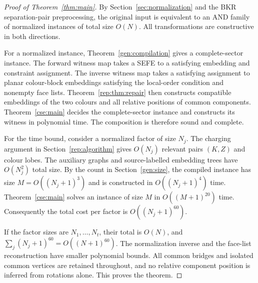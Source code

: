 \begin{proof}[Proof of Theorem~\ref{thm:main}]
By Section~\ref{sec:normalization} and the BKR separation-pair
preprocessing, the original input is equivalent to an AND family of
normalized instances of total size $O(N)$.  All transformations are
constructive in both directions.

For a normalized instance, Theorem~\ref{gen:compilation} gives a
complete-sector instance.  The forward witness map takes a SEFE to a
satisfying embedding and constraint assignment.  The inverse witness map
takes a satisfying assignment to planar colour-block embeddings satisfying
the local-order condition and nonempty face lists.  Theorem~\ref{rep:thm:repair}
then constructs compatible embeddings of the two colours and all relative
positions of common components.  Theorem~\ref{cse:main} decides the
complete-sector instance and constructs its witness in polynomial time.
The composition is therefore sound and complete.

For the time bound, consider a normalized factor of size $N_j$.  The
charging argument in Section~\ref{rep:algorithm} gives $O(N_j)$ relevant
pairs $(K,Z)$ and colour lobes.  The auxiliary graphs and source-labelled
embedding trees have $O(N_j^2)$ total size.  By the count in
Section~\ref{gen:size}, the compiled instance has size
$M=O((N_j+1)^3)$ and is constructed in $O((N_j+1)^4)$ time.
Theorem~\ref{cse:main} solves an instance of size $M$ in $O((M+1)^{20})$
time.  Consequently the total cost per factor is $O((N_j+1)^{60})$.

If the factor sizes are $N_1,\ldots,N_t$, their total is $O(N)$, and
$\sum_j(N_j+1)^{60}=O((N+1)^{60})$.  The normalization inverse and the
face-list reconstruction have smaller polynomial bounds.  All common
bridges and isolated common vertices are retained throughout, and no
relative component position is inferred from rotations alone.  This
proves the theorem.\qedhere
\end{proof}
